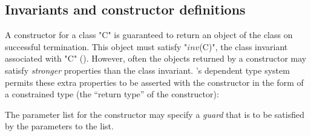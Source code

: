 \subsection{Invariants and constructor definitions}

A constructor for a class \xcd"C" is guaranteed to return an object of the
class on successful termination. This object must satisfy  \xcdmath"$\mathit{inv}$(C)", the
class invariant associated with \xcd"C" ().
However,
often the objects returned by a constructor may satisfy {\em stronger}
properties than the class invariant. \Xten{}'s dependent type system
permits these extra properties to be asserted with the constructor in
the form of a constrained type (the ``return type'' of the constructor):


\label{ConstructorGuard}

The parameter list for the constructor
may specify a \emph{guard} that is to be satisfied by the parameters
to the list.

